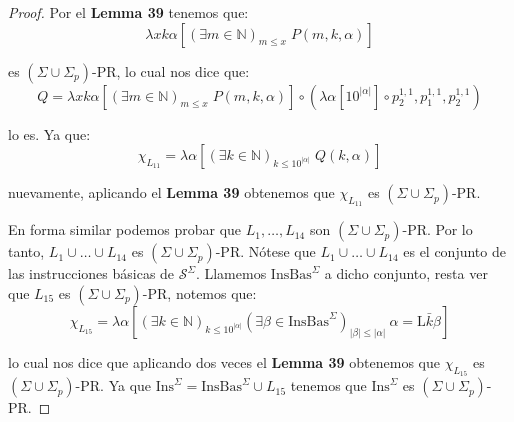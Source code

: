 \begin{proof}
    \PN Por el \textbf{Lemma 39} tenemos que:
    \[
      \lambda xk\alpha \left[(\exists m \in \mathbb{N})_{m\leq x} \; P(m,k,\alpha) \right]
    \]

    \PN es $(\Sigma \cup \Sigma_{p})$-PR, lo cual nos dice que:
    \[
      Q = \lambda xk\alpha \left[(\exists m \in \mathbb{N})_{m\leq x} \; P(m,k,\alpha) \right] \circ (\lambda \alpha
      \left[10^{\lvert \alpha \rvert}\right] \circ p_{2}^{1,1},p_{1}^{1,1},p_{2}^{1,1})
    \]

    \PN lo es. Ya que:
    \[
      \chi_{L_{11}} = \lambda \alpha \left[(\exists k \in \mathbb{N})_{k \leq 10^{\lvert \alpha \rvert}} \; Q(k,\alpha)
      \right]
    \]

    \PN nuevamente, aplicando el \textbf{Lemma 39} obtenemos que $\chi_{L_{11}}$ es $(\Sigma \cup \Sigma_{p})$-PR.

    \PN En forma similar podemos probar que $L_{1}, \dotsc, L_{14}$ son $(\Sigma \cup \Sigma_{p})$-PR. Por lo tanto,
    $L_{1} \cup \dotsc \cup L_{14}$ es $(\Sigma \cup \Sigma_{p})$-PR. Nótese que $L_{1} \cup \dotsc \cup L_{14}$ es el
    conjunto de las instrucciones básicas de $\mathcal{S}^{\Sigma}$. Llamemos $\mathrm{InsBas}^{\Sigma}$ a dicho
    conjunto, resta ver que $L_{15}$ es $(\Sigma \cup \Sigma_{p})$-PR, notemos que:
    \[
      \chi_{L_{15}}=\lambda \alpha \left[ (\exists k\in \mathbb{N})_{k\leq 10^{\lvert \alpha \rvert}}(\exists \beta \in
      \mathrm{InsBas}^{\Sigma})_{\lvert \beta \rvert \leq \lvert \alpha \rvert} \ \alpha = \mathrm{L}\bar{k}\beta\right]
    \]

    \PN lo cual nos dice que aplicando dos veces el \textbf{Lemma 39} obtenemos que $\chi_{L_{15}}$ es $(\Sigma \cup
    \Sigma_{p})$-PR. Ya que $\mathrm{Ins}^{\Sigma} = \mathrm{InsBas}^{\Sigma} \cup L_{15}$ tenemos que
    $\mathrm{Ins}^{\Sigma}$ es $(\Sigma \cup \Sigma_{p})$-PR.
  \end{proof}

